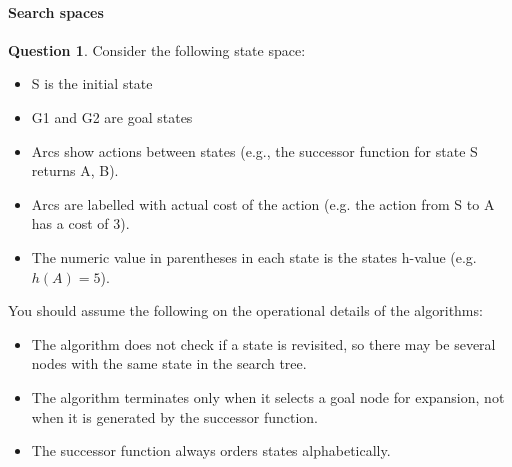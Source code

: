 \documentclass[11pt,a4paper]{article}
\theoremstyle{definition}%
\newtheorem{Q}{Question}[] %
\begin{document}
\paragraph{Search spaces}
\begin{Q}
Consider the following state space:
\begin{center}
\end{center}

\begin{itemize}
    \item S is the initial state 
    \item G1 and G2 are goal states
    \item Arcs show actions between states (e.g., the successor function for state S returns {A,
    B}).
    \item Arcs are labelled with actual cost of the action (e.g. the action from S to A has a cost
    of 3).
    \item The numeric value in parentheses in each state is the states h-value (e.g. $h(A) = 5$).
\end{itemize}
You should assume the following on the operational details of the algorithms:

\begin{itemize}
    \item The algorithm does not check if a state is revisited, so there may be several nodes with
    the same state in the search tree.
    \item The algorithm terminates only when it selects a goal node for expansion, not when it
    is generated by the successor function.
    \item The successor function always orders states alphabetically.
\end{itemize}


\end{Q}
\end{document}
